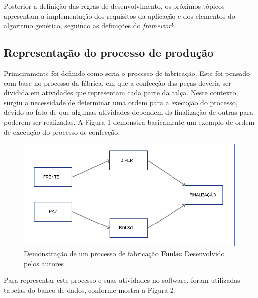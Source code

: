 \par Posterior a definição das regras de desenvolvimento, os próximos tópicos apresentam a implementação 
dos requisitos da aplicação e dos elementos do algoritmo genético, seguindo as definições do \textit{framework}.

\subsection{Representação do processo de produção}

\par Primeiramente foi definido como seria o processo de fabricação. Este foi pensado com base no 
processo da fábrica, em que a confecção das peças deveria ser dividida em atividades que representam
cada parte da calça. Neste contexto, surgiu a necessidade de determinar uma ordem para a execução do processo, 
devido ao fato de que algumas atividades dependem da finalização de outras para poderem ser
realizadas. A Figura 1 demonstra basicamente um exemplo de ordem de execução do processo de confecção.

\newpage

\begin{figure}[h!]
	\centerline{\includegraphics[scale=0.6]{./imagens/processo1.png}}
	\caption[Processo de fabricação]
	{Demonstração de um processo de fabricação \textbf{Fonte:} Desenvolvido pelos autores}
	\label{fig:exemplo1}
\end{figure}

\par Para representar este processo e suas atividades no software, foram utilizadas tabelas do banco de dados, conforme
mostra a Figura 2.

